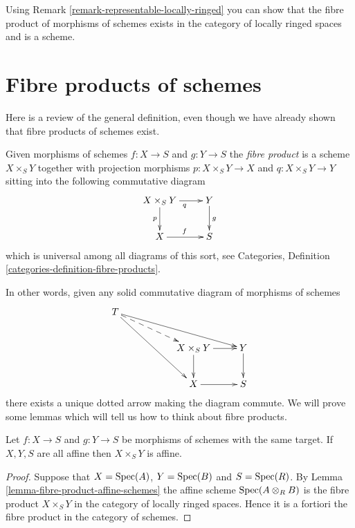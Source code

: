 \begin{remark}
\label{remark-fibre-product-schemes-locally-ringed}
Using Remark \ref{remark-representable-locally-ringed}
you can show that the fibre product of morphisms of schemes
exists in the category of locally ringed spaces and is a
scheme.
\end{remark}




\section{Fibre products of schemes}
\label{section-fibre-products}

\noindent
Here is a review of the general definition, even though
we have already shown that fibre products of schemes exist.

\begin{definition}
\label{definition-fibre-product}
Given morphisms of schemes $f : X \to S$ and $g : Y \to S$
the {\it fibre product} is a scheme $X \times_S Y$ together
with projection morphisms $p : X \times_S Y \to X$
and $q : X \times_S Y \to Y$ sitting into the following
commutative diagram
$$
\xymatrix{
X \times_S Y \ar[r]_q \ar[d]_p & Y \ar[d]^g \\
X \ar[r]^f & S
}
$$
which is universal among all diagrams of this sort,
see Categories, Definition \ref{categories-definition-fibre-products}.
\end{definition}

\noindent
In other words, given any solid commutative diagram of
morphisms of schemes
$$
\xymatrix{
T \ar[rrrd] \ar@{-->}[rrd] \ar[rrdd]
&
&
\\
&
&
X \times_S Y \ar[d] \ar[r]
&
Y \ar[d]
\\
&
&
X \ar[r]
&
S
}
$$
there exists a unique dotted arrow making the diagram commute.
We will prove some lemmas which will tell us how to think about
fibre products.

\begin{lemma}
\label{lemma-fibre-product-affines}
Let $f : X \to S$ and $g : Y \to S$ be morphisms of schemes
with the same target. If $X, Y, S$ are all affine then
$X \times_S Y$ is affine.
\end{lemma}

\begin{proof}
Suppose that $X = \mathop{\mathrm{Spec}}(A)$, $Y = \mathop{\mathrm{Spec}}(B)$
and $S = \mathop{\mathrm{Spec}}(R)$. By Lemma \ref{lemma-fibre-product-affine-schemes}
the affine scheme $\mathop{\mathrm{Spec}}(A \otimes_R B)$
is the fibre product $X \times_S Y$ in the category
of locally ringed spaces. Hence it is a fortiori the
fibre product in the category of schemes.
\end{proof}

